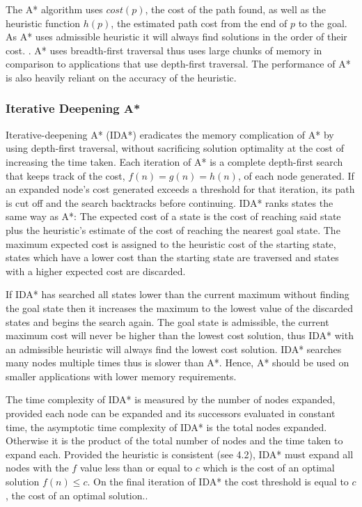 \documentclass[final]{cmpreport}
\begin{document}
The A* algorithm uses $cost(p)$, the cost of the path found, as well as the heuristic function $h(p)$, the estimated path cost from the end of $p$ to the goal. As A* uses admissible heuristic it will always find solutions in the order of their cost. \citep{DBLP:journals/ker/Brewka96}.  A* uses breadth-first traversal thus uses large chunks of memory in comparison to applications that use depth-first traversal. The performance of A* is also heavily reliant on the accuracy of the heuristic.






\subsubsection{Iterative Deepening A*}
Iterative-deepening A* (IDA*) eradicates the memory complication of A* by using depth-first traversal, without sacrificing solution optimality at the cost of increasing the time taken. Each iteration of A* is a complete depth-first search that keeps track of the cost, $f(n) = g(n) = h(n)$, of each node generated. If an expanded node's cost generated exceeds a threshold for that iteration, its path is cut off and the search backtracks before continuing. IDA* ranks states the same way as A*: The expected cost of a state is the cost of reaching said state plus the heuristic's estimate of the cost of reaching the nearest goal state. The maximum expected cost is assigned to the heuristic cost of the starting state, states which have a lower cost than the starting state are traversed and states with a higher expected cost are discarded. 


If IDA* has searched all states lower than the current maximum without finding the goal state then it increases the maximum to the lowest value of the discarded states and begins the search again. The goal state is admissible, the current maximum cost will never be higher than the lowest cost solution, thus IDA* with an admissible heuristic will always find the lowest cost solution.  IDA* searches many nodes multiple times thus is slower than A*. Hence, A* should be used on smaller applications with lower memory requirements.


The time complexity of IDA* is measured by the number of nodes expanded, provided each node can be expanded and its successors evaluated in constant time, the asymptotic time complexity of IDA* is the total nodes expanded. Otherwise it is the product of the total number of nodes and the time taken to expand each. Provided the heuristic is consistent (see 4.2), IDA* must expand all nodes with the $f$ value less than or equal to $c$ which  is the cost of an optimal solution $f(n) \leq c$. On the final iteration of IDA* the cost threshold is equal to $c$, the cost of an optimal solution.\citep{DBLP:journals/ai/KorfRE01}.
\end{document}

